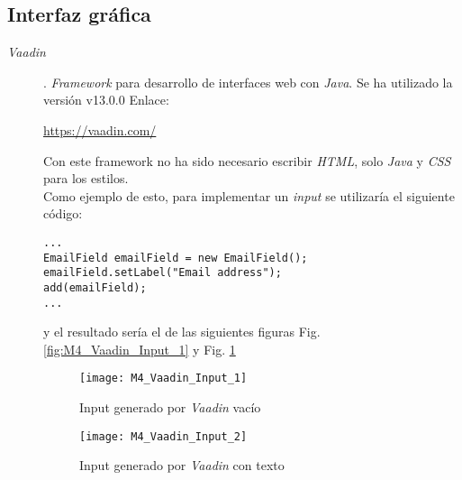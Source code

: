 \subsection{Interfaz gráfica}
\begin{description}
	\item[\textit{Vaadin}]. \textit{Framework} para desarrollo de interfaces web con \textit{Java}.
		Se ha utilizado la versión  v13.0.0 Enlace:
		
		\url{https://vaadin.com/}
		
		Con este framework no ha sido necesario escribir \textit{HTML}, solo \textit{Java} y \textit{CSS} para los estilos. 
		\\Como ejemplo de esto, para implementar un \textit{input} se utilizaría el siguiente código:
		
\begin{minipage}{\linewidth}
\tiny \begin{verbatim}
...
EmailField emailField = new EmailField();
emailField.setLabel("Email address");
add(emailField);
...
\end{verbatim}
\end{minipage}	

		y el resultado sería el de las siguientes figuras Fig. \ref{fig:M4_Vaadin_Input_1} y Fig. \ref{fig:M4_Vaadin_Input_2}
\begin{figure}[!h]
	\centering
	\texttt{[image: M4\_Vaadin\_Input\_1]}
	\caption{Input generado por \textit{Vaadin} vacío}\label{fig:M4_Vaadin_Input_1}
	
	
	\texttt{[image: M4\_Vaadin\_Input\_2]}
	\caption{Input generado por \textit{Vaadin} con texto}\label{fig:M4_Vaadin_Input_2}
\end{figure}
\FloatBarrier

\end{description}
